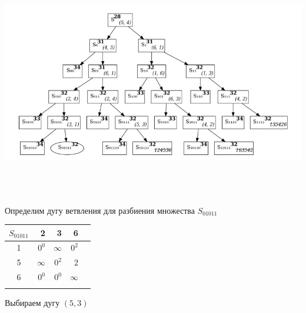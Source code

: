 \documentclass[12pt]{article}
\begin{document}
\begin{flushleft}
 
\includegraphics[width = 15cm, height = 10cm]{pictures/picture_02.jpg}\\
\end{flushleft}
\vspace{3cm}
\begin{flushleft}
 
Определим дугу ветвления для разбиения множества $S_{01011}$\\
\end{flushleft}

\begin{flushleft}
 \begin{tabular}{c||rrr||c}
$S_{01011}$  &2 & 3  & 6 & \\
\hline
\hline
1 & $0^0$ & $\infty$ & $0^2$ & \\
5 & $\infty$ &  $0^2$ & 2 &\\
6 & $0^0$ & $0^0$  & $\infty$ & \\
\hline
\hline
 & &  &   & \\
\end{tabular}
\end{flushleft}

Выбираем дугу $(5,3)$
\end{document}
